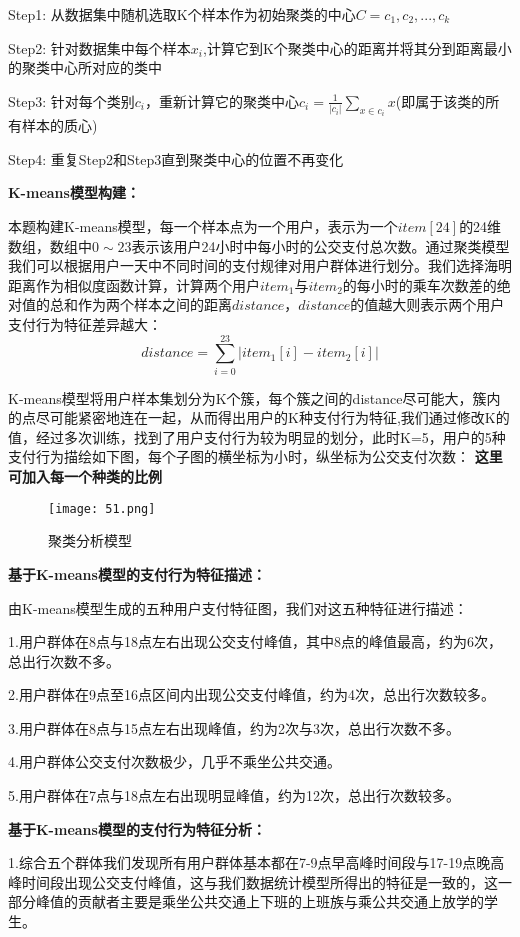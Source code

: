 \documentclass[withoutpreface,bwprint]{cumcmthesis} %
\begin{document}
Step1: 从数据集中随机选取K个样本作为初始聚类的中心$C={c_1,c_2,...,c_k}$

Step2: 针对数据集中每个样本$x_i$,计算它到K个聚类中心的距离并将其分到距离最小的聚类中心所对应的类中

Step3: 针对每个类别$c_i$，重新计算它的聚类中心$c_i=\frac{1}{\left|c_i\right|}\sum_{x \in c_i}x$(即属于该类的所有样本的质心)

Step4: 重复Step2和Step3直到聚类中心的位置不再变化

\textbf{K-means模型构建：}

本题构建K-means模型，每一个样本点为一个用户，表示为一个$item[24]$的24维数组，数组中$0\sim23$表示该用户24小时中每小时的公交支付总次数。通过聚类模型我们可以根据用户一天中不同时间的支付规律对用户群体进行划分。我们选择海明距离作为相似度函数计算，计算两个用户$item_1$与$item_2$的每小时的乘车次数差的绝对值的总和作为两个样本之间的距离$distance$，$distance$的值越大则表示两个用户支付行为特征差异越大：
\begin{equation}
distance=\sum_{i=0}^{23}|item_1[i]-item_2[i]|
\end{equation}

K-means模型将用户样本集划分为K个簇，每个簇之间的distance尽可能大，簇内的点尽可能紧密地连在一起，从而得出用户的K种支付行为特征,我们通过修改K的值，经过多次训练，找到了用户支付行为较为明显的划分，此时K=5，用户的5种支付行为描绘如下图，每个子图的横坐标为小时，纵坐标为公交支付次数：
\textbf{这里可加入每一个种类的比例}
\begin{figure}[h]
\centering
\texttt{[image: 51.png]}
\caption{聚类分析模型}
\end{figure}

\textbf{基于K-means模型的支付行为特征描述：}

由K-means模型生成的五种用户支付特征图，我们对这五种特征进行描述：

1.用户群体在8点与18点左右出现公交支付峰值，其中8点的峰值最高，约为6次，总出行次数不多。

2.用户群体在9点至16点区间内出现公交支付峰值，约为4次，总出行次数较多。

3.用户群体在8点与15点左右出现峰值，约为2次与3次，总出行次数不多。

4.用户群体公交支付次数极少，几乎不乘坐公共交通。

5.用户群体在7点与18点左右出现明显峰值，约为12次，总出行次数较多。

\textbf{基于K-means模型的支付行为特征分析：}

1.综合五个群体我们发现所有用户群体基本都在7-9点早高峰时间段与17-19点晚高峰时间段出现公交支付峰值，这与我们数据统计模型所得出的特征是一致的，这一部分峰值的贡献者主要是乘坐公共交通上下班的上班族与乘公共交通上放学的学生。
\end{document}
